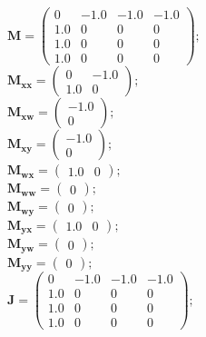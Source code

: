 \documentclass[11pt, oneside]{article}      %
\begin{document}
%
$ \mathbf{M} = \left(\begin{array}{cccc}0 & -1.0 & -1.0 & -1.0\\1.0 & 0 & 0 & 0\\1.0 & 0 & 0 & 0\\1.0 & 0 & 0 & 0\end{array}\right) ; $ 
%
\\
%
$ \mathbf{M_{xx}} = \left(\begin{array}{cc}0 & -1.0\\1.0 & 0\end{array}\right) ; $ 
%
\\
%
$ \mathbf{M_{xw}} = \left(\begin{array}{c}-1.0\\0\end{array}\right) ; $ 
%
\\
%
$ \mathbf{M_{xy}} = \left(\begin{array}{c}-1.0\\0\end{array}\right) ; $ 
%
\\
%
$ \mathbf{M_{wx}} = \left(\begin{array}{cc}1.0 & 0\end{array}\right) ; $ 
%
\\
%
$ \mathbf{M_{ww}} = \left(\begin{array}{c}0\end{array}\right) ; $ 
%
\\
%
$ \mathbf{M_{wy}} = \left(\begin{array}{c}0\end{array}\right) ; $ 
%
\\
%
$ \mathbf{M_{yx}} = \left(\begin{array}{cc}1.0 & 0\end{array}\right) ; $ 
%
\\
%
$ \mathbf{M_{yw}} = \left(\begin{array}{c}0\end{array}\right) ; $ 
%
\\
%
$ \mathbf{M_{yy}} = \left(\begin{array}{c}0\end{array}\right) ; $ 
%
\\
%
$ \mathbf{J} = \left(\begin{array}{cccc}0 & -1.0 & -1.0 & -1.0\\1.0 & 0 & 0 & 0\\1.0 & 0 & 0 & 0\\1.0 & 0 & 0 & 0\end{array}\right) ; $ 
\end{document}
